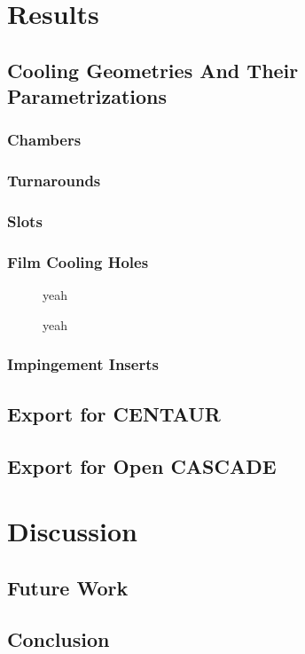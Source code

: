 \documentclass[a4paper, 11pt]{report}
\theoremstyle{definition}
\begin{document}
\chapter{Results}
\section{Cooling Geometries And Their Parametrizations}
\subsection{Chambers}
\subsection{Turnarounds}
\subsection{Slots}
\subsection{Film Cooling Holes}
\begin{figure}[H]
	\centering
	
	\caption{yeah}
\end{figure}
\begin{figure}[H]
	\centering
	
	\caption{yeah}
\end{figure}


\subsection{Impingement Inserts}
\section{Export for CENTAUR}
\section{Export for Open CASCADE}

\chapter{Discussion}
\section{Future Work}
\section{Conclusion}
\cite{Piegl1997}

\printbibliography[heading=bibnumbered, title=References]
\end{document}
